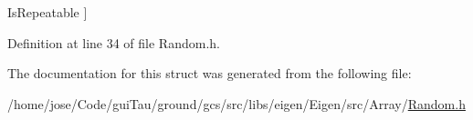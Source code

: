 \begin{Desc}
\begin{description}
{\hypertarget{structei__functor__traits_3_01ei__scalar__random__op_3_01_scalar_01_4_01_4_a2f02f94e62967537657928887b32e319a7b06521b9655b99ea5d57057bf2a099f}{Is\-Repeatable}\label{structei__functor__traits_3_01ei__scalar__random__op_3_01_scalar_01_4_01_4_a2f02f94e62967537657928887b32e319a7b06521b9655b99ea5d57057bf2a099f}
}]\end{description}
\end{Desc}


Definition at line 34 of file Random.\-h.



The documentation for this struct was generated from the following file\-:\begin{DoxyCompactItemize}
\item 
/home/jose/\-Code/gui\-Tau/ground/gcs/src/libs/eigen/\-Eigen/src/\-Array/\hyperlink{_random_8h}{Random.\-h}\end{DoxyCompactItemize}
